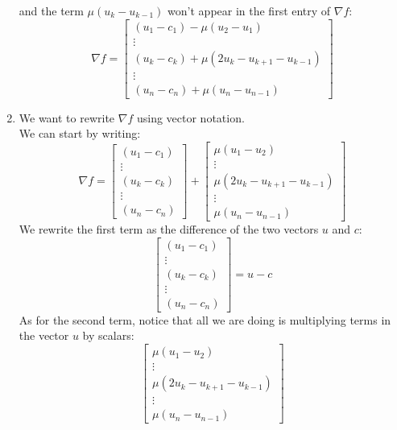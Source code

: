 \documentclass[12pt]{article}
\begin{document}
\begin{enumerate}[label=\alph*)]
        and the term  $\mu(u_{k} - u_{k-1})$
        won't appear in the first entry of $\nabla f$:
        \[ \nabla f = \begin{bmatrix}
        (u_1 - c_1) - \mu(u_{2} - u_1) \\
        \vdots \\
        (u_k - c_k) + \mu(2u_k - u_{k+1} - u_{k-1}) \\
        \vdots \\
        (u_n - c_n) + \mu(u_{n} - u_{n-1})
        \end{bmatrix} \]
        \item 
        We want to rewrite $\nabla f$ using vector
        notation. \\
        We can start by writing:
        \[ \nabla f = \begin{bmatrix}
        (u_1 - c_1) \\
        \vdots \\
        (u_k - c_k) \\
        \vdots \\
        (u_n - c_n)
        \end{bmatrix} + \begin{bmatrix}
        \mu(u_1-u_{2}) \\
        \vdots \\
        \mu(2u_k - u_{k+1} - u_{k-1}) \\
        \vdots \\
        \mu(u_{n} - u_{n-1})
        \end{bmatrix} \]
        We rewrite the first term as the
        difference of the two vectors $u$ and $c$:
        \[\begin{bmatrix}
            (u_1 - c_1) \\
            \vdots \\
            (u_k - c_k) \\
            \vdots \\
            (u_n - c_n)
        \end{bmatrix}  = u - c \]
        As for the second term,
        notice that all we are doing is multiplying
        terms in the vector $u$
        by scalars:
        \[ \begin{bmatrix}
            \mu(u_1-u_{2}) \\
            \vdots \\
            \mu(2u_k - u_{k+1} - u_{k-1}) \\
            \vdots \\
            \mu(u_{n} - u_{n-1})

\end{bmatrix}\]
\end{enumerate}
\end{document}
